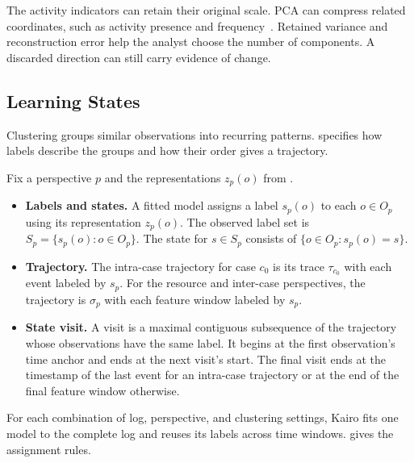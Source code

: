 The activity indicators can retain their original scale. PCA can compress related coordinates, such as activity presence and frequency~\cite{hotelling1933components}. Retained variance and reconstruction error help the analyst choose the number of components. A discarded direction can still carry evidence of change.

\subsection{Learning States}\label{sec:approach-states}

Clustering groups similar observations into recurring patterns.  specifies how labels describe the groups and how their order gives a trajectory.

\begin{Definition}\label{def:state-model}
Fix a perspective $p$ and the representations $z_p(o)$ from .
\begin{itemize}
  \item \textbf{Labels and states.} A fitted model assigns a label $s_p(o)$ to each $o\in O_p$ using its representation $z_p(o)$. The observed label set is $S_p=\{s_p(o):o\in O_p\}$. The state for $s\in S_p$ consists of $\{o\in O_p:s_p(o)=s\}$.
  \item \textbf{Trajectory.} The intra-case trajectory for case $c_0$ is its trace $\tau_{c_0}$ with each event labeled by $s_p$. For the resource and inter-case perspectives, the trajectory is $\sigma_p$ with each feature window labeled by $s_p$.
  \item \textbf{State visit.} A visit is a maximal contiguous subsequence of the trajectory whose observations have the same label. It begins at the first observation's time anchor and ends at the next visit's start. The final visit ends at the timestamp of the last event for an intra-case trajectory or at the end of the final feature window otherwise.
\end{itemize}
\end{Definition}

For each combination of log, perspective, and clustering settings, Kairo fits one model to the complete log and reuses its labels across time windows.  gives the assignment rules.


